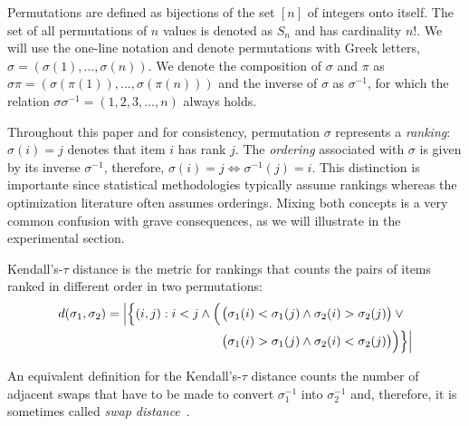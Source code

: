 \documentclass[sigconf,dvipsnames]{acmart}
\newcommand{\ken}{Kendall's-$\tau$\xspace}
\begin{document}
Permutations are defined as bijections of the set $[n]$ of integers onto itself. The set of all permutations of $n$ values is denoted as $S_n$ and has cardinality $n!$. We will use the one-line notation
and denote permutations with Greek letters, $\sigma  = (\sigma(1), \ldots , \sigma(n))$. We denote the composition of $\sigma$ and $\pi$ as $\sigma\pi = (\sigma(\pi(1)), \ldots, \sigma(\pi(n)))$
and the inverse of $\sigma$ as $\sigma^{-1}$, for which the relation $\sigma\sigma^{-1}=(1, 2, 3, \dotsc,n)$ always holds.

Throughout this paper and for consistency, permutation $\sigma$ represents a \emph{ranking}:  $\sigma(i)=j$ denotes that item $i$ has rank $j$. The \emph{ordering} associated with $\sigma$ is given by its inverse $\sigma^{-1}$, therefore,  $\sigma(i)=j \Leftrightarrow  \sigma^{-1}(j)=i$. This distinction is importante since statistical methodologies typically assume rankings whereas the optimization literature often assumes orderings. Mixing both concepts is a very common confusion with grave consequences, as we will illustrate in the experimental section.

\ken distance is the metric for rankings that counts the pairs of items ranked in different order in two permutations:
%
\begin{equation}
\begin{split}
d(\sigma _{1},\sigma_{2})=\left\lvert\Bigl\{(i,j):i<j \land \phantom{}\Bigl(\right.&\bigl(\sigma_{1}(i) < \sigma_{1}(j)\land \sigma_{2}(i)>\sigma_{2}(j)\bigr)\lor \phantom{} \\
 &\bigl(\sigma_{1}(i)>\sigma_{1}(j)\land \sigma_{2}(i)<\sigma_{2}(j)\bigr)\Bigr)\Bigr\}\Bigr\rvert\\
 \end{split}
 \label{eq:kendall_decomp}
\end{equation}

An equivalent definition for the \ken distance counts the number of adjacent swaps that have to be made to convert $\sigma_1^{-1}$ into $\sigma_2^{-1}$ and, therefore, it is sometimes called \emph{swap distance}~\citep{ZaeStoBar2014:ppsn}. %
\end{document}
